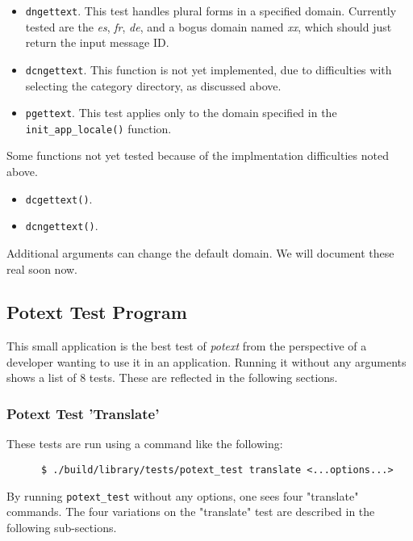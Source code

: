 \begin{itemize}
      \item \texttt{dngettext}.
         This test handles plural forms in a specified domain.
         Currently tested are the \textsl{es}, \textsl{fr}, \textsl{de},
         and a bogus domain named \textsl{xx}, which should just return
         the input message ID.
      \item \texttt{dcngettext}.
         This function is not yet implemented, due to difficulties
         with selecting the category directory, as discussed above.
      \item \texttt{pgettext}.
         This test applies only to the domain specified in the
         \texttt{init\_app\_locale()} function.
   \end{itemize}

   Some functions not yet tested because of the implmentation difficulties
   noted above.

   \begin{itemize}
      \item \texttt{dcgettext()}.
      \item \texttt{dcngettext()}.
   \end{itemize}

   Additional arguments can change the default domain.
   We will document these real soon now.

\subsection{Potext Test Program}
\label{subsec:potext_test_program}

   This small application is the best test of \textsl{potext} from the
   perspective of a developer wanting to use it in an application.
   Running it without any arguments shows a list of 8 tests.
   These are reflected in the following sections.

\subsubsection{Potext Test 'Translate'}
\label{subsubsec:potext_test_translate}

   These tests are run using a command like the following:

   \begin{verbatim}
      $ ./build/library/tests/potext_test translate <...options...>
   \end{verbatim}

   By running \texttt{potext\_test} without any options, one sees
   four "translate" commands.
   The four variations on the "translate"
   test are described in the following sub-sections.

